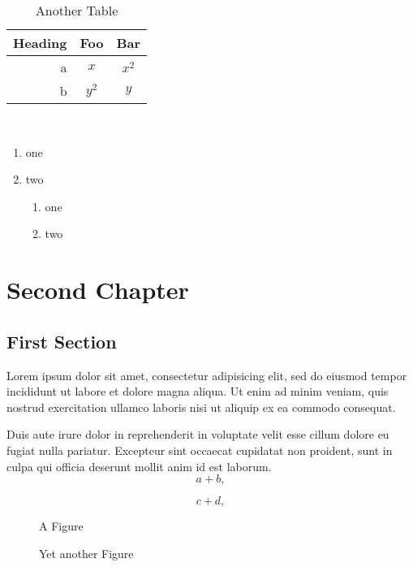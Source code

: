 \documentclass{book}
\begin{document}
\begin{table}
\begin{centering}
\begin{tabular}{r|cc}
Heading & Foo & Bar\\\hline
a & $x$ & $x^2$\\
b & $y^2$ & $y$\\
\end{tabular}\\
\end{centering}
\caption{Another Table}
\end{table}

\begin{enumerate}
 \item one
 \item two
   \begin{enumerate}
    \item one
    \item two
   \end{enumerate}
\end{enumerate}

\chapter{Second Chapter}
\section{First Section}
Lorem ipsum dolor sit amet, consectetur adipisicing elit, sed do eiusmod tempor incididunt ut labore et dolore magna aliqua. Ut enim ad minim veniam, quis nostrud exercitation ullamco laboris nisi ut aliquip ex ea commodo consequat.

Duis aute irure dolor in reprehenderit in voluptate velit esse cillum dolore eu fugiat nulla pariatur. Excepteur sint occaecat cupidatat non proident, sunt in culpa qui officia deserunt mollit anim id est laborum.
\begin{equation}
 a + b,
\end{equation}

\begin{equation}
 c + d,
\end{equation}

\begin{figure}
\begin{centering}
A Figure\\
\end{centering}
\caption{Yet another Figure}
\end{figure}
\end{document}
